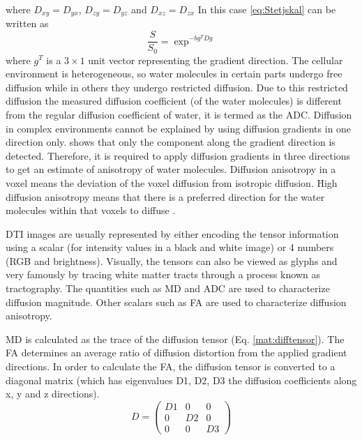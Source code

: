 \documentclass[msthesis.tex]{subfiles}
\begin{document}
where $D_{xy} = D_{yx}$, $D_{zy}=D_{yz}$ and $D_{xz}=D_{zx}$
In this case \autoref{eq:Stetjskal} can be written as 
\begin{equation}
\frac{S}{S_0} = \exp^{-bg^T Dg}
\end{equation}where $g^T$ is a $3 \times 1$ unit vector representing the gradient direction.
The cellular environment is heterogeneous, so water molecules in certain parts undergo free diffusion while in others they undergo restricted diffusion. Due to this restricted diffusion the measured diffusion coefficient (of the water molecules) is different from the regular diffusion coefficient of water, it is termed as the \gls{ADC}. Diffusion in complex environments cannot be explained by using diffusion gradients in one direction only.  shows that only the component along the gradient direction is detected. Therefore, it is required to apply diffusion gradients in three directions to get an estimate of anisotropy of water molecules. Diffusion anisotropy in a voxel means the deviation of the voxel diffusion from isotropic diffusion. High diffusion anisotropy means that there is a preferred direction for the water molecules within that voxels to diffuse \citep{clark2011mean}.

\gls{DTI} images are usually represented by either encoding the tensor information using a scalar (for intensity values in a black and white image) or 4 numbers (\gls{RGB} and brightness). Visually, the tensors can also be viewed as glyphs and very famously by tracing white matter tracts through a process known as tractography. The quantities such as \gls{MD} and \gls{ADC} are used to characterize diffusion magnitude. Other scalars such as \gls{FA} are used to characterize diffusion anisotropy. 

\gls{MD} is calculated as the trace of the diffusion tensor (Eq. \ref{mat:difftensor}). The \gls{FA} determines an average ratio of diffusion distortion from the applied gradient directions. In order to calculate the FA, the diffusion tensor is converted to a diagonal matrix (which has eigenvalues D1, D2, D3 the diffusion coefficients along x, y and z directions). \\
\begin{equation*}
D =
 \begin{pmatrix}
D1 & 0 & 0 \\
0 & D2 & 0 \\
0 & 0 & D3
\end{pmatrix}   
\end{equation*}
\end{document}
